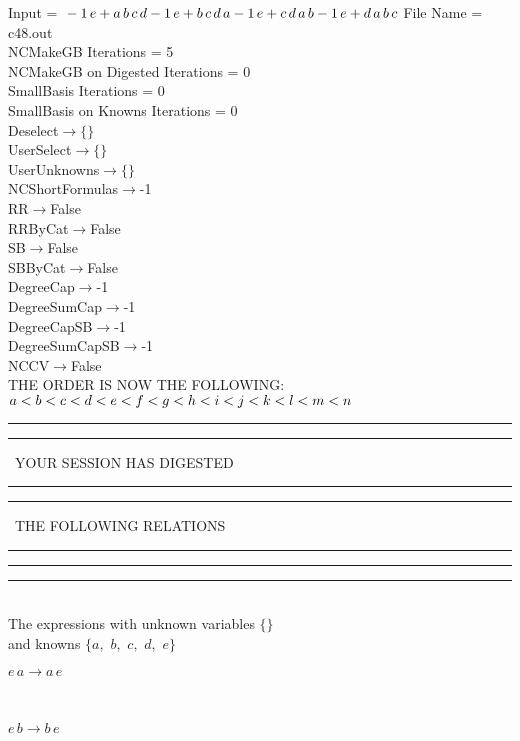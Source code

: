 \documentclass[rep10,leqno]{report}
\begin{document}
\normalsize
\baselineskip=12pt
\noindent
Input = 
$
\\-1\,
 e + a\,
 b\,
 c\,
 d\\
-1\,
 e + b\,
 c\,
 d\,
 a\\
-1\,
 e + c\,
 d\,
 a\,
 b\\
-1\,
 e + d\,
 a\,
 b\,
 c\\
$
File Name = c48.out\\
NCMakeGB Iterations = 5\\
NCMakeGB on Digested Iterations = 0\\
SmallBasis Iterations = 0\\
SmallBasis on Knowns Iterations = 0\\
Deselect$\rightarrow \{\}$\\
UserSelect$\rightarrow \{\}$\\
UserUnknowns$\rightarrow \{\}$\\
NCShortFormulas$\rightarrow$-1\\
RR$\rightarrow $False\\
RRByCat$\rightarrow $False\\
SB$\rightarrow $False\\
SBByCat$\rightarrow $False\\
DegreeCap$\rightarrow $-1\\
DegreeSumCap$\rightarrow $-1\\
DegreeCapSB$\rightarrow $-1\\
DegreeSumCapSB$\rightarrow $-1\\
NCCV$\rightarrow $False\\
THE ORDER IS NOW THE FOLLOWING:\hfil\break
$
a<b<c<d<e<f<g<h<i<j<k<l<m<n\\
$
\rule[2pt]{6in}{4pt}\hfil\break
\rule[2pt]{1.879in}{4pt}
\ YOUR SESSION HAS DIGESTED\ 
\rule[2pt]{1.879in}{4pt}\hfil\break
\rule[2pt]{1.923in}{4pt}
\ THE FOLLOWING RELATIONS\ 
\rule[2pt]{1.923in}{4pt}\hfil\break
\rule[2pt]{6in}{4pt}\hfil\break
\rule[3pt]{6in}{.7pt}\\
The expressions with unknown variables $\{\}$\\
and knowns $\{a,
$ $
b,
$ $
c,
$ $
d,
$ $
e\}$\smallskip\\
\begin{minipage}{6in}
$
e\,
 a\rightarrow a\,
 e
$
\end{minipage}\medskip \\
\begin{minipage}{6in}
$
e\,
 b\rightarrow b\,
 e
$
\end{minipage}\medskip \\
\end{document}
